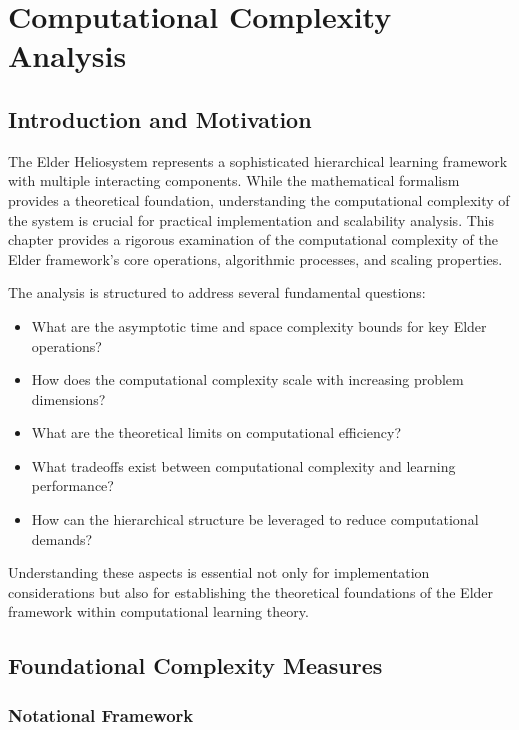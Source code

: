 \chapter{Computational Complexity Analysis}

\section{Introduction and Motivation}

The Elder Heliosystem represents a sophisticated hierarchical learning framework with multiple interacting components. While the mathematical formalism provides a theoretical foundation, understanding the computational complexity of the system is crucial for practical implementation and scalability analysis. This chapter provides a rigorous examination of the computational complexity of the Elder framework's core operations, algorithmic processes, and scaling properties.

The analysis is structured to address several fundamental questions:
\begin{itemize}
    \item What are the asymptotic time and space complexity bounds for key Elder operations?
    \item How does the computational complexity scale with increasing problem dimensions?
    \item What are the theoretical limits on computational efficiency?
    \item What tradeoffs exist between computational complexity and learning performance?
    \item How can the hierarchical structure be leveraged to reduce computational demands?
\end{itemize}

Understanding these aspects is essential not only for implementation considerations but also for establishing the theoretical foundations of the Elder framework within computational learning theory.

\section{Foundational Complexity Measures}



\subsection{Notational Framework}

